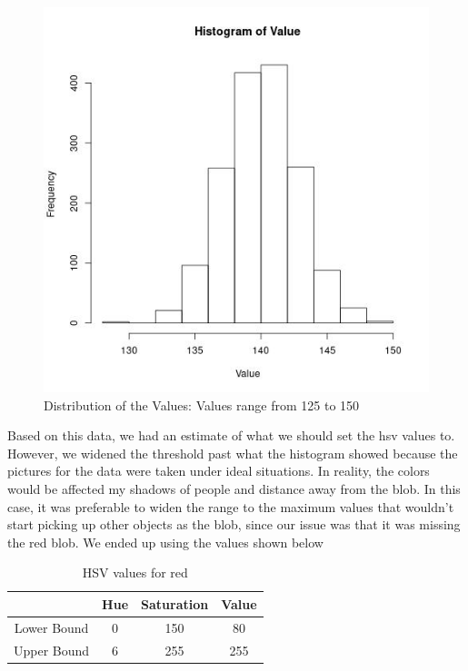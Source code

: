 \documentclass[journal, a4paper]{IEEEtran}
\begin{document}
\begin{figure}[H]
\includegraphics[scale=.50]{vplot.jpg}
\caption{Distribution of the Values: Values range from 125 to 150}
\end{figure}
Based on this data, we had an estimate of what we should set the hsv values to. However, we widened the threshold past what the histogram showed because the pictures for the data were taken under ideal situations. In reality, the colors would be affected my shadows of people and distance away from the blob. In this case, it was preferable to widen the range to the maximum values that wouldn't start picking up other objects as the blob, since our issue was that it was missing the red blob. We ended up using the values shown below \\
    \begin{table}[!hbt]
        \begin{center}
        \caption{HSV values for red}
        \begin{tabular}{|c|c|c|c|}
            \hline
              & Hue & Saturation & Value\\
            \hline
            Lower Bound& 0 & 150 & 80 \\
            \hline
            Upper Bound & 6 & 255 & 255 \\
            \hline
        \end{tabular}
        \end{center}
    \end{table} \\
\end{document}
